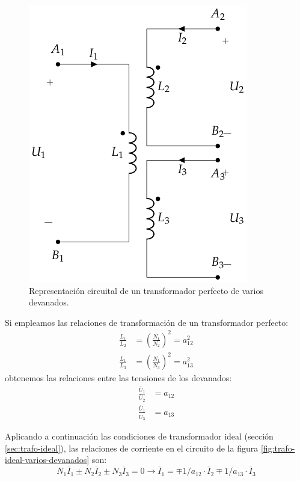 \begin{figure}
  \centering
  \includegraphics[height=0.25\textheight]{../figs/TrafoPerfectoVariosDevanados.pdf}
  \caption{Representación circuital de un transformador perfecto de varios devanados.}
  \label{fig:trafo-perfecto-varios-devanados}
\end{figure}

Si empleamos las relaciones de transformación de un transformador perfecto:
      \begin{align*}
  \frac{L_1}{L_2} &= \left(\frac{N_1}{N_2}\right)^2 = a^2_{12}\\
  \frac{L_1}{L_3} &= \left(\frac{N_1}{N_3}\right)^2 = a^2_{13}
\end{align*}
obtenemos las relaciones entre las tensiones de los devanados:
\begin{align}
  \frac{\overline{U}_1}{\overline{U}_2} &= a_{12}\\
  \frac{\overline{U}_1}{\overline{U}_3} &= a_{13}\label{eq:trafo-ideal-varios-devanados-tensiones}
\end{align}

Aplicando a continuación las condiciones de transformador ideal (sección \ref{sec:trafo-ideal}), las relaciones de corriente en el circuito de la figura \ref{fig:trafo-ideal-varios-devanados} son:
\begin{equation}
  \label{eq:trafo-ideal-varios-devanados-corrientes}
    N_1 \overline{I}_1 \pm N_ 2\overline{I}_2 \pm N_3
    \overline{I}_{3} = 0 \rightarrow
    \overline{I}_1 = \mp 1/a_{12} \cdot \overline{I}_2 \mp
    1/a_{13} \cdot \overline{I}_3
\end{equation}

